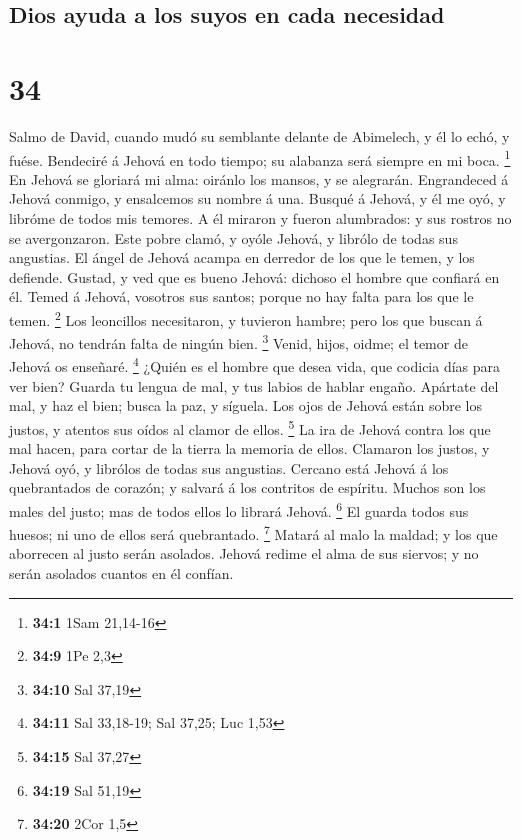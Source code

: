 \hypertarget{dios-ayuda-a-los-suyos-en-cada-necesidad}{%
\subsection{Dios ayuda a los suyos en cada
necesidad}\label{dios-ayuda-a-los-suyos-en-cada-necesidad}}

\hypertarget{section-33}{%
\section{34}\label{section-33}}

 Salmo de David, cuando mudó su semblante delante de
Abimelech, y él lo echó, y fuése. Bendeciré á Jehová en todo tiempo; su
alabanza será siempre en mi boca. \footnote{\textbf{34:1} 1Sam 21,14-16}
 En Jehová se gloriará mi alma: oiránlo los mansos, y se
alegrarán.  Engrandeced á Jehová conmigo, y ensalcemos su
nombre á una.  Busqué á Jehová, y él me oyó, y libróme de
todos mis temores.  A él miraron y fueron alumbrados: y sus
rostros no se avergonzaron.  Este pobre clamó, y oyóle
Jehová, y librólo de todas sus angustias.  El ángel de
Jehová acampa en derredor de los que le temen, y los defiende.
 Gustad, y ved que es bueno Jehová: dichoso el hombre que
confiará en él.  Temed á Jehová, vosotros sus santos; porque
no hay falta para los que le temen. \footnote{\textbf{34:9} 1Pe 2,3}
 Los leoncillos necesitaron, y tuvieron hambre; pero los
que buscan á Jehová, no tendrán falta de ningún bien. \footnote{\textbf{34:10}
  Sal 37,19}  Venid, hijos, oidme; el temor de Jehová os
enseñaré. \footnote{\textbf{34:11} Sal 33,18-19; Sal 37,25; Luc 1,53}
 ¿Quién es el hombre que desea vida, que codicia días para
ver bien?  Guarda tu lengua de mal, y tus labios de hablar
engaño.  Apártate del mal, y haz el bien; busca la paz, y
síguela.  Los ojos de Jehová están sobre los justos, y
atentos sus oídos al clamor de ellos. \footnote{\textbf{34:15} Sal 37,27}
 La ira de Jehová contra los que mal hacen, para cortar de
la tierra la memoria de ellos.  Clamaron los justos, y
Jehová oyó, y librólos de todas sus angustias.  Cercano
está Jehová á los quebrantados de corazón; y salvará á los contritos de
espíritu.  Muchos son los males del justo; mas de todos
ellos lo librará Jehová. \footnote{\textbf{34:19} Sal 51,19}
 El guarda todos sus huesos; ni uno de ellos será
quebrantado. \footnote{\textbf{34:20} 2Cor 1,5}  Matará al
malo la maldad; y los que aborrecen al justo serán asolados.
 Jehová redime el alma de sus siervos; y no serán asolados
cuantos en él confían.

